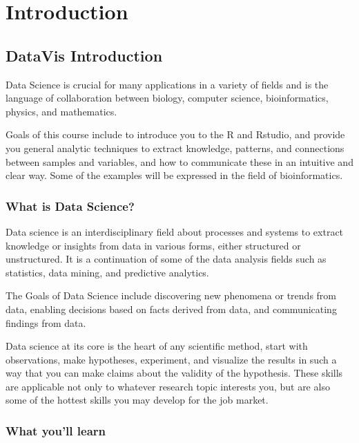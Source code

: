 \documentclass[
]{article}
\author{}
\date{\vspace{-2.5em}}
\begin{document}
\hypertarget{introduction}{%
\section{Introduction}\label{introduction}}

\hypertarget{datavis-introduction}{%
\subsection{DataVis Introduction}\label{datavis-introduction}}

Data Science is crucial for many applications in a variety of fields and
is the language of collaboration between biology, computer science,
bioinformatics, physics, and mathematics.

Goals of this course include to introduce you to the R and Rstudio, and
provide you general analytic techniques to extract knowledge, patterns,
and connections between samples and variables, and how to communicate
these in an intuitive and clear way. Some of the examples will be
expressed in the field of bioinformatics.

\hypertarget{what-is-data-science}{%
\subsubsection{What is Data Science?}\label{what-is-data-science}}

Data science is an interdisciplinary field about processes and systems
to extract knowledge or insights from data in various forms, either
structured or unstructured. It is a continuation of some of the data
analysis fields such as statistics, data mining, and predictive
analytics.

The Goals of Data Science include discovering new phenomena or trends
from data, enabling decisions based on facts derived from data, and
communicating findings from data.

Data science at its core is the heart of any scientific method, start
with observations, make hypotheses, experiment, and visualize the
results in such a way that you can make claims about the validity of the
hypothesis. These skills are applicable not only to whatever research
topic interests you, but are also some of the hottest skills you may
develop for the job market.

\hypertarget{what-youll-learn}{%
\subsubsection{What you'll learn}\label{what-youll-learn}}
\end{document}
